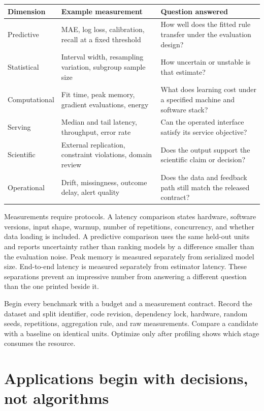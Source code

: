 \begin{tabularx}{\textwidth}{@{}p{}p{}X@{}}
\toprule
Dimension & Example measurement & Question answered \\
\midrule
Predictive & MAE, log loss, calibration, recall at a fixed threshold & How well
does the fitted rule transfer under the evaluation design? \\
Statistical & Interval width, resampling variation, subgroup sample size & How
uncertain or unstable is that estimate? \\
Computational & Fit time, peak memory, gradient evaluations, energy & What does
learning cost under a specified machine and software stack? \\
Serving & Median and tail latency, throughput, error rate & Can the operated
interface satisfy its service objective? \\
Scientific & External replication, constraint violations, domain review & Does
the output support the scientific claim or decision? \\
Operational & Drift, missingness, outcome delay, alert quality & Does the data
and feedback path still match the released contract? \\
\bottomrule
\end{tabularx}

Measurements require protocols. A latency comparison states hardware, software
versions, input shape, warmup, number of repetitions, concurrency, and whether
data loading is included. A predictive comparison uses the same held-out units
and reports uncertainty rather than ranking models by a difference smaller than
the evaluation noise. Peak memory is measured separately from serialized model
size. End-to-end latency is measured separately from estimator latency. These
separations prevent an impressive number from answering a different question
than the one printed beside it.

\begin{professionalbox}
Begin every benchmark with a budget and a measurement contract. Record the
dataset and split identifier, code revision, dependency lock, hardware,
random seeds, repetitions, aggregation rule, and raw measurements. Compare a
candidate with a baseline on identical units. Optimize only after profiling
shows which stage consumes the resource.
\end{professionalbox}

\section{Applications begin with decisions, not algorithms}

